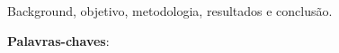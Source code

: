 \begin{resumo}

Background, objetivo, metodologia, resultados e conclusão.

 \vspace{\onelineskip}

 \noindent
 \textbf{Palavras-chaves}:
\end{resumo}
